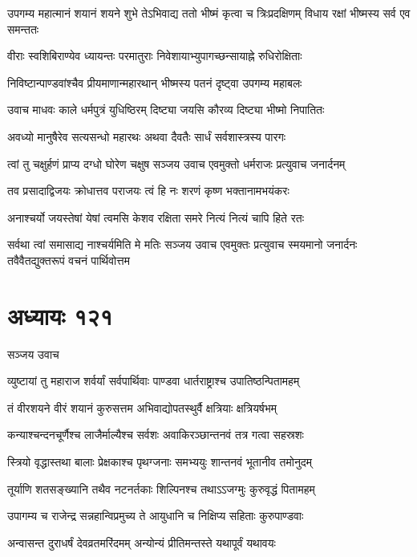 उपगम्य महात्मानं शयानं शयने शुभे
\twolineshloka
{तेऽभिवाद्य ततो भीष्मं कृत्वा च त्रिःप्रदक्षिणम्}
{विधाय रक्षां भीष्मस्य सर्व एव समन्ततः}


\twolineshloka
{वीराः स्वशिबिराण्येव ध्यायन्तः परमातुराः}
{निवेशायाभ्युपागच्छन्सायाह्ने रुधिरोक्षिताः}


\twolineshloka
{निविष्टान्पाण्डवांश्चैव प्रीयमाणान्महारथान्}
{भीष्मस्य पतनं दृष्ट्वा उपगम्य महाबलः}


\twolineshloka
{उवाच माधवः काले धर्मपुत्रं युधिष्ठिरम्}
{दिष्ट्या जयसि कौरव्य दिष्ट्या भीष्मो निपातितः}


\twolineshloka
{अवध्यो मानुषैरेव सत्यसन्धो महारथः}
{अथवा दैवतैः सार्धं सर्वशास्त्रस्य पारगः}


\threelineshloka
{त्वां तु चक्षुर्हणं प्राप्य दग्धो घोरेण चक्षुष}
{सञ्जय उवाच}
{एवमुक्तो धर्मराजः प्रत्युवाच जनार्दनम्}


\twolineshloka
{तव प्रसादाद्विजयः क्रोधात्तव पराजयः}
{त्वं हि नः शरणं कृष्ण भक्तानामभयंकरः}


\twolineshloka
{अनाश्चर्यो जयस्तेषां येषां त्वमसि केशव}
{रक्षिता समरे नित्यं नित्यं चापि हिते रतः}


\fourlineindentedshloka
{सर्वथा त्वां समासाद्य नाश्चर्यमिति मे मतिः}
{सञ्जय उवाच}
{एवमुक्तः प्रत्युवाच स्मयमानो जनार्दनः}
{तवैवैतद्युक्तरूपं वचनं पार्थिवोत्तम}


\chapter{अध्यायः १२१}
\twolineshloka
{सञ्जय उवाच}
{}


\twolineshloka
{व्युष्टायां तु महाराज शर्वर्यां सर्वपार्थिवाः}
{पाण्डवा धार्तराष्ट्राश्च उपातिष्ठन्पितामहम्}


\twolineshloka
{तं वीरशयने वीरं शयानं कुरुसत्तम}
{अभिवाद्योपतस्थुर्वै क्षत्रियाः क्षत्रियर्षभम्}


\twolineshloka
{कन्याश्चन्दनचूर्णैश्च लाजैर्माल्यैश्च सर्वशः}
{अवाकिरञ्छान्तनवं तत्र गत्वा सहस्रशः}


\twolineshloka
{स्त्रियो वृद्धास्तथा बालाः प्रेक्षकाश्च पृथग्जनाः}
{समभ्ययुः शान्तनवं भूतानीव तमोनुदम्}


\twolineshloka
{तूर्याणि शतसङ्ख्यानि तथैव नटनर्तकाः}
{शिल्पिनश्च तथाऽऽजग्मुः कुरुवृद्धं पितामहम्}


\twolineshloka
{उपागम्य च राजेन्द्र सन्नहान्विप्रमुच्य ते}
{आयुधानि च निक्षिप्य सहिताः कुरुपाण्डवाः}


\twolineshloka
{अन्वासन्त दुराधर्षं देवव्रतमरिंदमम्}
{अन्योन्यं प्रीतिमन्तस्ते यथापूर्वं यथावयः}


